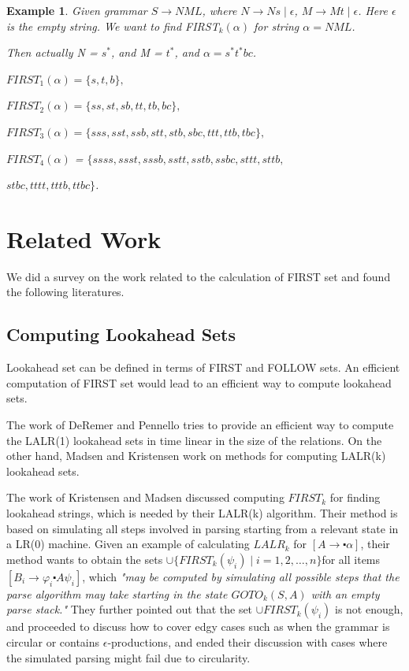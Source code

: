 \documentclass{sig-alternate-05-2015}
\newtheorem{SampleEnv}{Example}[section]
\begin{document}
\begin{SampleEnv}
Given grammar $S\rightarrow NML$, where $N\rightarrow Ns\mid \epsilon$, $M\rightarrow Mt\mid\epsilon$.
Here $\epsilon$ is the empty string. We want to find FIRST$_k(\alpha)$ for string $\alpha = NML$.

Then actually N = $s^*$, and M = $t^*$, and $\alpha=s^*t^*bc$.

$FIRST_1(\alpha)= \{s,t,b\}, $

$FIRST_2(\alpha)=\{ss,st,sb,tt,tb,bc\}, $

$FIRST_3(\alpha)=\{sss,sst,ssb,stt,stb,sbc,ttt,ttb,tbc\},$

$FIRST_4(\alpha)$ = $\{ssss,ssst,sssb,sstt,sstb,ssbc,sttt,sttb,$

$stbc,tttt,tttb,ttbc\}$.
\end{SampleEnv}


\section{Related Work}
We did a survey on the work related to the calculation of FIRST set and found the following literatures.

\subsection{Computing Lookahead Sets}
Lookahead set can be defined in terms of FIRST and FOLLOW sets. An efficient computation of FIRST set would lead to an efficient way to compute lookahead sets.

The work of DeRemer and Pennello\cite{DeRemer82lalr} tries to provide an efficient way to compute the LALR(1) lookahead sets in time linear in the size of the relations. 
On the other hand, Madsen and Kristensen\cite{kristensen81lalr} work on methods for computing LALR(k) lookahead sets.

The work of Kristensen and Madsen \cite{kristensen81lalr} discussed computing
$FIRST_k$ for finding lookahead strings, which is needed by
their LALR(k) algorithm. Their method is based on simulating
all steps involved in parsing starting from a relevant
state in a LR(0) machine. Given an example of calculating
$LALR_k$ for $[A\rightarrow \centerdot \alpha]$, their method wants to obtain the
sets $\cup \{FIRST_k(\psi_i) \mid i = 1,2, …, n\} $for all items 
$[B_i\rightarrow \varphi_i \centerdot A \psi_i]$, which 
\textit{"may be computed by simulating all possible
steps that the parse algorithm may take starting in the state
$GOTO_k(S, A)$ with an empty parse stack."}
They further
pointed out that the set $\cup {FIRST_k(\psi_i)}$ is not enough, and
proceeded to discuss how to cover edgy cases such as when
the grammar is circular or contains $\epsilon$-productions, and
ended their discussion with cases where the simulated parsing
might fail due to circularity.
\end{document}
